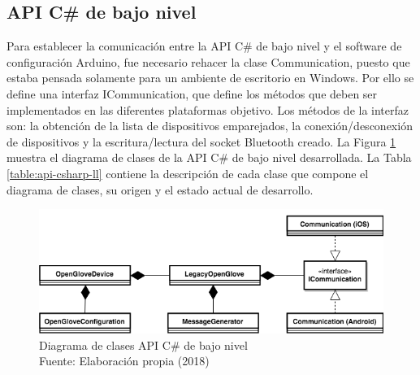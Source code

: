 \subsection{API C\# de bajo nivel}
\label{subseccion-estructura-api-ll}
Para establecer la comunicación entre la API C\# de bajo nivel  y el software de configuración Arduino, fue necesario rehacer la clase Communication, puesto que estaba pensada solamente para un ambiente de escritorio en Windows. Por ello se define una interfaz ICommunication, que define los métodos que deben ser implementados en las diferentes plataformas objetivo. Los métodos de la interfaz son: la obtención de la lista de dispositivos emparejados, la conexión/desconexión de dispositivos y la escritura/lectura del socket Bluetooth creado. La Figura \ref{fig:api-csharp-ll} muestra el diagrama de clases de la API C\# de bajo nivel  desarrollada.  La Tabla \ref{table:api-csharp-ll} contiene la descripción de cada clase que compone el diagrama de clases, su origen y el estado actual de desarrollo.


\begin{figure}[H]
  \begin{center} 
   	\includegraphics[width=1.0\textwidth]{images/chapter04/OpenGlove-Architecture-API-CSharp-LowLevel.png} 
    \caption[Diagrama de clases API C\# de bajo nivel]{Diagrama de clases API C\# de bajo nivel \\Fuente: Elaboración propia (2018)}
    \label{fig:api-csharp-ll}
  \end{center}
\end{figure}




